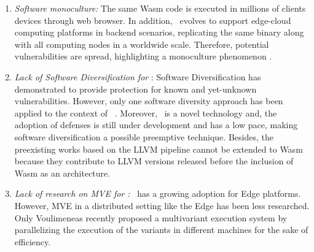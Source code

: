 \begin{enumerate}
    
    \item \emph{Software monoculture:}  
    The same Wasm code is executed in millions of clients devices through web browser.
    In addition, \wasm\ evolves to support edge-cloud computing platforms in backend scenarios, \ie replicating the same binary along with all computing nodes in a worldwide scale. Therefore, potential vulnerabilities are spread, highlighting a monoculture phenomenon \cite{Harrand1650630}. 

    \item \emph{Lack of Software Diversification for \wasm}:  Software Diversification has demonstrated to provide protection for known and yet-unknown vulnerabilities. However, only one software diversity approach has been applied to the context of \wasm\ \cite{wobfuscator}. 
    Moreover, \wasm\ is a novel technology and, the adoption of defenses is still under development \cite{Narayan2021Swivel, johnson2021} and has a low pace, making software diversification a possible preemptive technique.
    Besides, the preexisting works based on the LLVM pipeline cannot be extended to Wasm because they contribute to LLVM versions released before the inclusion of Wasm as an architecture. 
    
    \item \emph{Lack of research on MVE for \wasm:} \wasm\ has a growing adoption for Edge platforms. However, MVE in a distributed setting like the Edge has been less researched. Only Voulimeneas \etal \cite{voulimeneas2021dmvx} recently proposed a multivariant execution system by parallelizing the execution of the variants in different machines for the sake of efficiency. 


\end{enumerate}







